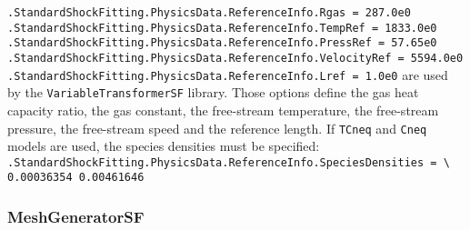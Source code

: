\documentclass[11pt,a4paper,oneside]{article}
\begin{document}
\newline
\hspace*{1cm}  \texttt{.StandardShockFitting.PhysicsData.ReferenceInfo.Rgas = 287.0e0}
\newline
\hspace*{1cm} \texttt{.StandardShockFitting.PhysicsData.ReferenceInfo.TempRef = 1833.0e0}
\newline
\hspace*{1cm} \texttt{.StandardShockFitting.PhysicsData.ReferenceInfo.PressRef = 57.65e0}
\newline
\hspace*{1cm} \texttt{.StandardShockFitting.PhysicsData.ReferenceInfo.VelocityRef = 5594.0e0}
\newline
\hspace*{1cm} \texttt{.StandardShockFitting.PhysicsData.ReferenceInfo.Lref = 1.0e0}
\newline
\newline
are used by the \texttt{VariableTransformerSF} library. 
\newline
Those options define the gas heat capacity ratio, the gas constant, the free-stream temperature, the free-stream pressure, the free-stream speed and the reference length. 
If \texttt{TCneq} and \texttt{Cneq} models are used, the species densities must be specified:
\newline
\newline
\hspace*{1.cm} \texttt{.StandardShockFitting.PhysicsData.ReferenceInfo.SpeciesDensities = \textbackslash{}}
\hspace*{1.4cm} \texttt{0.00036354 0.00461646}

\subsubsection{MeshGeneratorSF}
\end{document}
